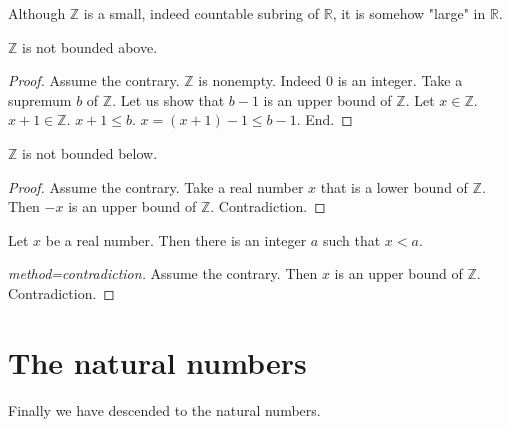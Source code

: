 \documentclass{article}
\begin{document}
%
Although $\mathbb{Z}$ is a small, indeed countable subring
of $\mathbb{R}$, it is somehow "large" in $\mathbb{R}$.
%
\begin{forthel}

\begin{theorem}[title=Archimedes 1]
$\mathbb{Z}$ is not bounded above.
\end{theorem}
\begin{proof}
Assume the contrary.
$\mathbb{Z}$ is nonempty. Indeed $0$ is an integer.
Take a supremum
$b$ of $\mathbb{Z}$.
Let us show that $b - 1$ is an upper bound of $\mathbb{Z}$.
Let $x \in \mathbb{Z}$. $x + 1 \in \mathbb{Z}$.
$x + 1 \leq b$.
$x = (x + 1) - 1 \leq b - 1$.
End.
\end{proof}

\begin{theorem}
$\mathbb{Z}$ is not bounded below.
\end{theorem}
\begin{proof}
Assume the contrary.
Take a real number $x$ that is a lower bound of $\mathbb{Z}$.
Then $-x$ is an upper bound of $\mathbb{Z}$.
Contradiction.
\end{proof}

\begin{theorem}[title=Archimedes 2]
Let $x$ be a real number.
Then there is an integer $a$
such that $x < a$.\end{theorem}
\begin{proof}[method=contradiction]
Assume the contrary.
Then $x$ is an upper bound of $\mathbb{Z}$.
Contradiction.
\end{proof}

\end{forthel}

\section{The natural numbers}

Finally we have descended to the natural numbers.
\end{document}
